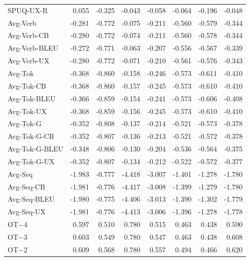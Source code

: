 {\begin{longtable}{@{}lrrrrrrr@{}}
SPUQ-UX-R & \phantom{-}0.055 & -0.325 & -0.043 & -0.058 & -0.064 & -0.196 & -0.048 \\
\addlinespace
Avg-Verb & -0.281 & -0.772 & -0.075 & -0.211 & -0.560 & -0.579 & -0.344 \\
Avg-Verb-CB & -0.280 & -0.772 & -0.074 & -0.211 & -0.560 & -0.578 & -0.344 \\
Avg-Verb-BLEU & -0.272 & -0.771 & -0.063 & -0.207 & -0.556 & -0.567 & -0.339 \\
Avg-Verb-UX & -0.280 & -0.772 & -0.071 & -0.210 & -0.561 & -0.576 & -0.343 \\
\addlinespace
Avg-Tok & -0.368 & -0.860 & -0.158 & -0.246 & -0.573 & -0.611 & -0.410 \\
Avg-Tok-CB & -0.368 & -0.860 & -0.157 & -0.245 & -0.573 & -0.610 & -0.410 \\
Avg-Tok-BLEU & -0.366 & -0.859 & -0.154 & -0.241 & -0.573 & -0.606 & -0.408 \\
Avg-Tok-UX & -0.368 & -0.859 & -0.156 & -0.245 & -0.573 & -0.610 & -0.410 \\
Avg-Tok-G & -0.352 & -0.808 & -0.137 & -0.214 & -0.521 & -0.573 & -0.378 \\
Avg-Tok-G-CB & -0.352 & -0.807 & -0.136 & -0.213 & -0.521 & -0.572 & -0.378 \\
Avg-Tok-G-BLEU & -0.348 & -0.806 & -0.130 & -0.204 & -0.536 & -0.564 & -0.375 \\
Avg-Tok-G-UX & -0.352 & -0.807 & -0.134 & -0.212 & -0.522 & -0.572 & -0.377 \\
\addlinespace
Avg-Seq & -1.983 & -0.777 & -4.418 & -3.007 & -1.401 & -1.278 & -1.780 \\
Avg-Seq-CB & -1.981 & -0.776 & -4.417 & -3.008 & -1.399 & -1.279 & -1.780 \\
Avg-Seq-BLEU & -1.980 & -0.775 & -4.406 & -3.013 & -1.390 & -1.302 & -1.779 \\
Avg-Seq-UX & -1.981 & -0.776 & -4.413 & -3.006 & -1.396 & -1.278 & -1.778 \\
\addlinespace
OT$-4$ & \phantom{-}0.597 & \phantom{-}0.510 & \phantom{-}0.780 & \phantom{-}0.515 & \phantom{-}0.463 & \phantom{-}0.438 & \phantom{-}0.590 \\
OT$-3$ & \phantom{-}0.603 & \phantom{-}0.549 & \phantom{-}0.780 & \phantom{-}0.547 & \phantom{-}0.463 & \phantom{-}0.438 & \phantom{-}0.608 \\
OT$-2$ & \phantom{-}0.609 & \phantom{-}0.568 & \phantom{-}0.780 & \phantom{-}0.557 & \phantom{-}0.494 & \phantom{-}0.466 & \phantom{-}0.620 \\

\end{longtable}}

